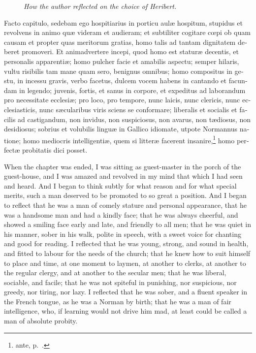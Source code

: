 \documentclass[10pt]{book}
\newcommand{\blockhead}[4][]{
\begin{figure}
\centering
\vspace{#4}
\parbox{2.75cm}{\begin{center}\footnotesize \color{BrickRed} \emph{#2}\\ #1 \end{center}}
\end{figure}
}
\begin{document}
\begin{paracol}{2}
\switchcolumn*

\begin{otherlanguage}{latin}
\blockhead{How the author reflected on the choice of Heribert.}{3}{-.55cm}
Facto capitulo, sedebam ego hospitiarius in porticu aul\ae{} hospitum, stupidus et revolvens in animo qu\ae{} videram et audieram; et subtiliter cogitare c\oe{}pi ob quam causam et propter quas meritorum gratias, homo talis ad tantam dignitatem deberet promoveri. Et animadvertere incepi, quod homo est statur\ae{} decentis, et personalis apparenti\ae{}; homo pulcher facie et amabilis aspectu; semper hilaris, vultu risibilis tam mane quam sero, benignus omnibus; homo compositus in gestu, in incessu gravis, verbo facetus, dulcem vocem habens in cantando et facundam in legendo; juvenis, fortis, et sanus in corpore, et expeditus ad laborandum pro necessitate ecclesi\ae{}; pro loco, pro tempore, nunc laicis, nunc clericis, nunc ecclesiasticis, nunc s\ae{}cularibus viris sciens se conformare; liberalis et socialis et facilis ad castigandum, non invidus, non suspiciosus, non avarus, non t\ae{}diosus, non desidiosus; sobrius et volubilis lingu\ae{} in Gallico idiomate, utpote Normannus natione; homo mediocris intelligenti\ae{}, quem si litter\ae{} facerent insanire,\footnote[\textdagger]{ante, p.\ .} homo perfect\ae{} probitatis dici posset.

\end{otherlanguage}

\switchcolumn

When the chapter was ended, I was sitting as guest-master in the porch of the guest-house, and I was amazed and revolved in my mind that which I had seen and heard. And I began to think subtly for what reason and for what special merits, such a man deserved to be promoted to so great a position. And I began to reflect that he was a man of comely stature and personal appearance, that he was a handsome man and had a kindly face; that he was always cheerful, and showed a smiling face early and late, and friendly to all men; that he was quiet in his manner, sober in his walk, polite in speech, with a sweet voice for chanting and good for reading. I reflected that he was young, strong, and sound in health, and fitted to labour for the needs of the church; that he knew how to suit himself to place and time, at one moment to laymen, at another to clerks, at another to the regular clergy, and at another to the secular men; that he was liberal, sociable, and facile; that he was not spiteful in punishing, nor suspicious, nor greedy, nor tiring, nor lazy. I reflected that he was sober, and a fluent speaker in the French tongue, as he was a Norman by birth; that he was a man of fair intelligence, who, if learning would not drive him mad, at least could be called a man of absolute probity.


\end{paracol}
\end{document}
